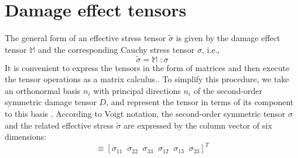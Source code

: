\documentclass[12pt,openright,twoside]{report}
\begin{document}
\section{Damage effect tensors}\label{Matrix Representation of Damage effect tensors}
\indent\indent\indent The general form of an effective stress tensor $\tilde{\sigma}$ is given by the damage effect tensor $\mathbb{M}$ and the corresponding Cauchy stress tensor $\sigma$, i.e.,
\begin{equation}
\tilde{\sigma}  = \mathbb{M} \; :  \sigma 
\label{eqn:effective_stress_tensor} 
\end{equation}
It is convenient to express the tensors in the form of matrices and then execute the tensor operations as a matrix calculus.. To simplify this procedure, we take an orthonormal basis ${n_{i}}$ with principal directions $n_{i}$ of the second-order symmetric damage tensor $D$, and represent the tensor in terms of its component to this basis \citep{murakami2012continuum}. According to Voigt notation, the second-order symmetric tensor $\sigma$ and the related effective stress $\tilde{\sigma}$ are expressed by the column vector of six dimensions:
\begin{equation}
   [\sigma_{P}]  \equiv  [\sigma_{11} \;\; \sigma_{22} \;\;\sigma_{33} \;\;\sigma_{12} \;\;\sigma_{13} \;\;\sigma_{23} ]^{T}
\end{equation}
\end{document}

